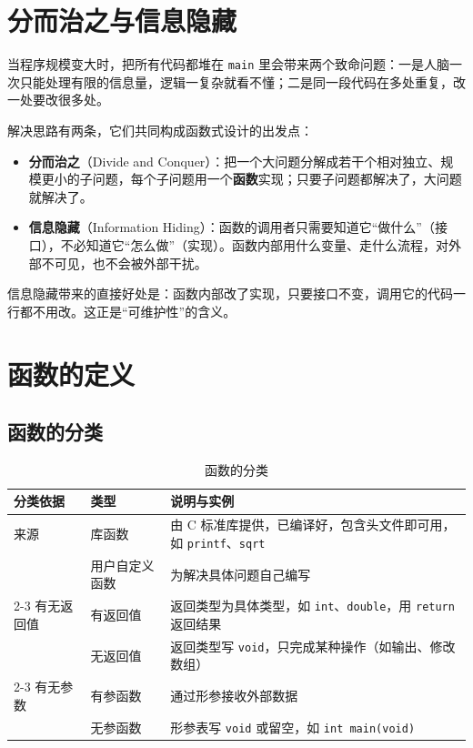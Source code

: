 ﻿%
\lstset{language=C}

\section{分而治之与信息隐藏}

当程序规模变大时，把所有代码都堆在 \texttt{main} 里会带来两个致命问题：一是人脑一次只能处理有限的信息量，逻辑一复杂就看不懂；二是同一段代码在多处重复，改一处要改很多处。

解决思路有两条，它们共同构成函数式设计的出发点：

\begin{itemize}
  \item \textbf{分而治之}（Divide and Conquer）：把一个大问题分解成若干个相对独立、规模更小的子问题，每个子问题用一个\textbf{函数}实现；只要子问题都解决了，大问题就解决了。
  \item \textbf{信息隐藏}（Information Hiding）：函数的调用者只需要知道它“做什么”（接口），不必知道它“怎么做”（实现）。函数内部用什么变量、走什么流程，对外部不可见，也不会被外部干扰。
\end{itemize}

信息隐藏带来的直接好处是：函数内部改了实现，只要接口不变，调用它的代码一行都不用改。这正是“可维护性”的含义。

\section{函数的定义}

\subsection{函数的分类}

\begin{table}[htbp]
\centering
\caption{函数的分类}
\small
\begin{tabularx}{\textwidth}{@{}lXX@{}}
\toprule
分类依据 & 类型 & 说明与实例 \\
\midrule
来源 & 库函数 & 由 C 标准库提供，已编译好，包含头文件即可用，如 \texttt{printf}、\texttt{sqrt} \\
 & 用户自定义函数 & 为解决具体问题自己编写 \\
\cmidrule(l){2-3}
有无返回值 & 有返回值 & 返回类型为具体类型，如 \texttt{int}、\texttt{double}，用 \texttt{return} 返回结果 \\
 & 无返回值 & 返回类型写 \texttt{void}，只完成某种操作（如输出、修改数组） \\
\cmidrule(l){2-3}
有无参数 & 有参函数 & 通过形参接收外部数据 \\
 & 无参函数 & 形参表写 \texttt{void} 或留空，如 \texttt{int main(void)} \\
\bottomrule
\end{tabularx}
\end{table}

